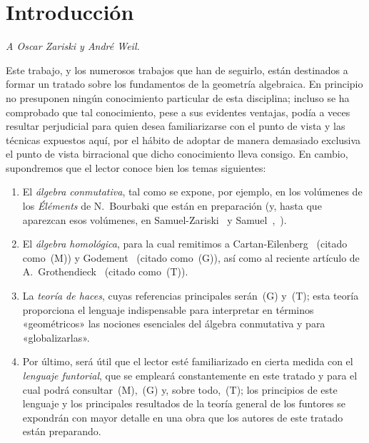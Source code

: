 
\section*{Introducción}

\begin{center}
\emph{A Oscar Zariski y André Weil.}
\end{center}


Este trabajo, y los numerosos trabajos que han de seguirlo, están destinados a formar un tratado sobre los fundamentos de la geometría algebraica.
En principio no presuponen ningún conocimiento particular de esta disciplina; incluso se ha comprobado que tal conocimiento, pese a sus evidentes ventajas, podía a veces resultar perjudicial para quien desea familiarizarse con el punto de vista y las técnicas expuestos aquí, por el hábito de adoptar de manera demasiado exclusiva el punto de vista birracional que dicho conocimiento lleva consigo.
En cambio, supondremos que el lector conoce bien los temas siguientes:

\begin{enumerate}
  \item[a)] El \emph{álgebra conmutativa}, tal como se expone, por ejemplo, en los volúmenes de los \emph{Éléments} de N.~Bourbaki que están en preparación (y, hasta que aparezcan esos volúmenes, en Samuel-Zariski~\cite{I-13} y Samuel~\cite{I-11},~\cite{I-12}).
  \item[b)] El \emph{álgebra homológica}, para la cual remitimos a Cartan-Eilenberg~\cite{I-2} (citado como~(M)) y Godement~\cite{I-4} (citado como~(G)), así como al reciente artículo de A.~Grothendieck~\cite{I-6} (citado como~(T)).
  \item[c)] La \emph{teoría de haces}, cuyas referencias principales serán~(G) y~(T); esta teoría proporciona el lenguaje indispensable para interpretar en términos «geométricos» las nociones esenciales del álgebra conmutativa y para «globalizarlas».
  \item[d)] Por último, será útil que el lector esté familiarizado en cierta medida con el \emph{lenguaje funtorial}, que se empleará constantemente en este tratado y para el cual podrá consultar~(M),~(G) y, sobre todo,~(T); los principios de este lenguaje y los principales resultados de la teoría general de los funtores se expondrán con mayor detalle en una obra que los autores de este tratado están preparando.
\end{enumerate}


